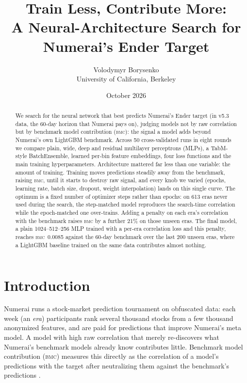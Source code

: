 \documentclass[11pt]{article}
\title{Train Less, Contribute More:\\A Neural-Architecture Search for Numerai's Ender Target}
\author{Volodymyr Borysenko\\\small University of California, Berkeley}
\date{October 2026}
\newcommand{\bmc}{\textsc{bmc}}
\begin{document}
\maketitle

\begin{abstract}
We search for the neural network that best predicts Numerai's Ender target (in v5.3 data,
the 60-day horizon that Numerai pays on), judging models not by raw correlation but by
benchmark model contribution (\bmc{}): the signal a model adds beyond Numerai's own LightGBM
benchmark. Across 50 cross-validated runs in eight rounds we compare plain, wide, deep and
residual multilayer perceptrons (MLPs), a TabM-style BatchEnsemble, learned per-bin feature
embeddings, four loss functions and the main training hyperparameters. Architecture mattered
far less than one variable: the amount of training. Training moves predictions steadily away
from the benchmark, raising \bmc{}, until it starts to destroy raw signal, and every knob we
varied (epochs, learning rate, batch size, dropout, weight interpolation) lands on this single
curve. The optimum is a fixed number of optimizer steps rather than epochs: on 613 eras never
used during the search, the step-matched model reproduces the search-time correlation while
the epoch-matched one over-trains. Adding a penalty on each era's correlation with the
benchmark raises \bmc{} by a further 21\% on those unseen eras. The final model, a plain
1024--512--256 MLP trained with a per-era correlation loss and this penalty, reaches
\bmc{}~0.0085 against the 60-day benchmark over the last 200 unseen eras, where a LightGBM
baseline trained on the same data contributes almost nothing.
\end{abstract}

\section{Introduction}

Numerai runs a stock-market prediction tournament on obfuscated data: each week (an
\emph{era}) participants rank several thousand stocks from a few thousand anonymized
features, and are paid for predictions that improve Numerai's meta model. A model with high
raw correlation that merely re-discovers what Numerai's benchmark models already know
contributes little. Benchmark model contribution (\bmc{}) measures this directly as the
correlation of a model's predictions with the target after neutralizing them against the
benchmark's predictions \citep{forum_benchmark_models,numerai_scoring}.
\end{document}
